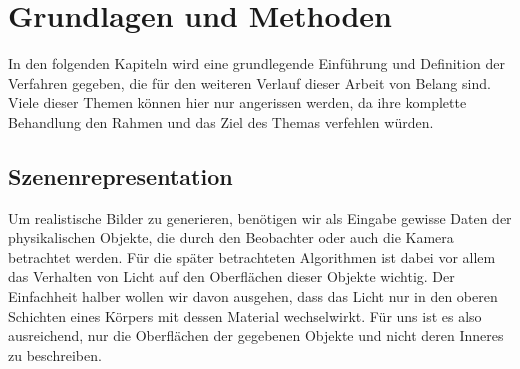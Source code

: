 \section{Grundlagen und Methoden} %
\label{sec:grundlagen_und_methoden}

	In den folgenden Kapiteln wird eine grundlegende Einführung und Definition der Verfahren gegeben, die für den weiteren Verlauf dieser Arbeit von Belang sind.
	Viele dieser Themen können hier nur angerissen werden, da ihre komplette Behandlung den Rahmen und das Ziel des Themas verfehlen würden.

	\subsection{Szenenrepresentation} %
	\label{sec:szenenrepresentation}

		Um realistische Bilder zu generieren, benötigen wir als Eingabe gewisse Daten der physikalischen Objekte, die durch den Beobachter oder auch die Kamera betrachtet werden.
		Für die später betrachteten Algorithmen ist dabei vor allem das Verhalten von Licht auf den Oberflächen dieser Objekte wichtig.
		Der Einfachheit halber wollen wir davon ausgehen, dass das Licht nur in den oberen Schichten eines Körpers mit dessen Material wechselwirkt.
		Für uns ist es also ausreichend, nur die Oberflächen der gegebenen Objekte und nicht deren Inneres zu beschreiben.

